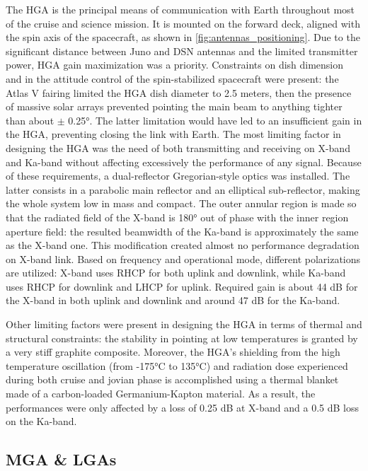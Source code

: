 The HGA\cite{juno_telecommunication}\cite{telecommunication_antennas} is the principal means of communication with Earth throughout most of the cruise and science mission. It is mounted on the forward deck, aligned with the spin axis of the spacecraft, as shown in \autoref{fig:antennas_positioning}.
Due to the significant distance between Juno and DSN antennas and the limited transmitter power, HGA gain maximization was a priority.
Constraints on dish dimension and in the attitude control of the spin-stabilized spacecraft were present: the Atlas V fairing limited the HGA dish diameter to 2.5 meters, then the presence of massive solar arrays prevented pointing the main beam to anything tighter than about $\pm$ 0.25°.
The latter limitation would have led to an insufficient gain in the HGA, preventing closing the link with Earth. The most limiting factor in designing the HGA was the need of both transmitting and receiving on X-band and Ka-band without affecting excessively the performance of any signal.
Because of these requirements, a dual-reflector Gregorian-style optics was installed. The latter consists in a parabolic main reflector and an elliptical sub-reflector, making the whole system low in mass and compact\cite{telecommunication_antennas}.
The outer annular region is made so that the radiated field of the X-band is 180° out of phase with the inner region aperture field: the resulted beamwidth of the Ka-band is approximately the same as the X-band one. This modification created almost no performance degradation on X-band link.
Based on frequency and operational mode, different polarizations are utilized: X-band uses RHCP for both uplink and downlink, while Ka-band uses RHCP for downlink and LHCP for uplink\cite{juno_telecommunication}. Required gain is about 44 dB for the X-band in both uplink and downlink and around 47 dB for the Ka-band.

Other limiting factors were present in designing the HGA in terms of thermal and structural constraints: the stability in pointing at low temperatures is granted by a very stiff graphite composite.
Moreover, the HGA's shielding from the high temperature oscillation (from -175°C to 135°C) and radiation dose experienced during both cruise and jovian phase is accomplished using a thermal blanket made of a carbon-loaded Germanium-Kapton material\cite{telecommunication_antennas}\cite{germanio}.
As a result, the performances were only affected by a loss of 0.25 dB at X-band and a 0.5 dB loss on the Ka-band. 

\subsection{MGA \& LGAs}
\label{subsec:mga_lga}

